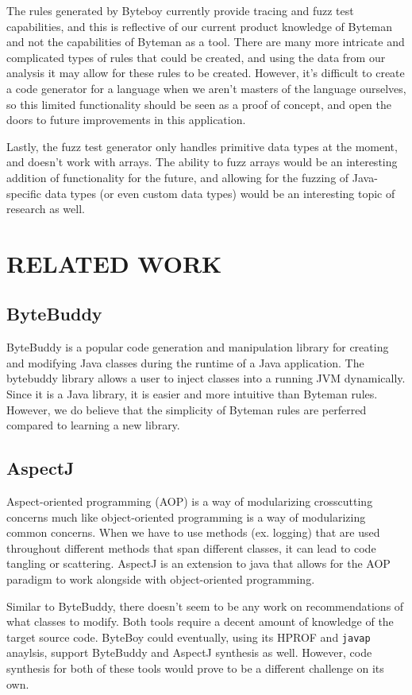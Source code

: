 \documentclass[letterpaper,twocolumn,10pt]{article}
\begin{document}
The rules generated by Byteboy currently provide tracing and fuzz test capabilities, and this is reflective of our current product knowledge of Byteman and not the capabilities of Byteman as a tool. There are many more intricate and complicated types of rules that could be created, and using the data from our analysis it may allow for these rules to be created. However, it's difficult to create a code generator for a language when we aren't masters of the language ourselves, so this limited functionality should be seen as a proof of concept, and open the doors to future improvements in this application.

Lastly, the fuzz test generator only handles primitive data types at the moment, and doesn't work with arrays. The ability to fuzz arrays would be an interesting addition of functionality for the future, and allowing for the fuzzing of Java-specific data types (or even custom data types) would be an interesting topic of research as well.

\section{RELATED WORK}

\subsection{ByteBuddy}
ByteBuddy is a popular code generation and manipulation library for creating and modifying Java classes during the runtime of a Java application\cite{bytebuddy}. The bytebuddy library allows a user to inject classes into a running JVM dynamically. Since it is a Java library, it is easier and more intuitive than Byteman rules. However, we do believe that the simplicity of Byteman rules are perferred compared to learning a new library.

\subsection{AspectJ}
Aspect-oriented programming (AOP) is a way of modularizing crosscutting concerns much like object-oriented programming is a way of modularizing common concerns\cite{aspectj}. When we have to use methods (ex. logging) that are used throughout different methods that span different classes, it can lead to code tangling or scattering. AspectJ is an extension to java that allows for the AOP paradigm to work alongside with object-oriented programming.

Similar to ByteBuddy, there doesn't seem to be any work on recommendations of what classes to modify. Both tools require a decent amount of knowledge of the target source code. ByteBoy could eventually, using its HPROF and {\tt javap} anaylsis, support ByteBuddy and AspectJ synthesis as well. However, code synthesis for both of these tools would prove to be a different challenge on its own.
\end{document}
